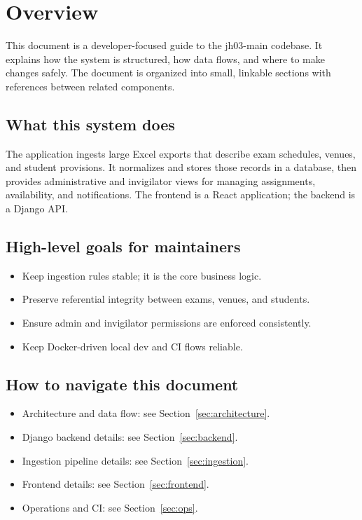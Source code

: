\section{Overview}
\label{sec:overview}

This document is a developer-focused guide to the jh03-main codebase. It explains how the system is structured, how data flows, and where to make changes safely. The document is organized into small, linkable sections with references between related components.

\subsection{What this system does}
\label{subsec:overview:problem}

The application ingests large Excel exports that describe exam schedules, venues, and student provisions. It normalizes and stores those records in a database, then provides administrative and invigilator views for managing assignments, availability, and notifications. The frontend is a React application; the backend is a Django API.

\subsection{High-level goals for maintainers}
\label{subsec:overview:maintainer_goals}

\begin{itemize}
  \item Keep ingestion rules stable; it is the core business logic.
  \item Preserve referential integrity between exams, venues, and students.
  \item Ensure admin and invigilator permissions are enforced consistently.
  \item Keep Docker-driven local dev and CI flows reliable.
\end{itemize}

\subsection{How to navigate this document}
\label{subsec:overview:navigation}

\begin{itemize}
  \item Architecture and data flow: see Section~\ref{sec:architecture}.
  \item Django backend details: see Section~\ref{sec:backend}.
  \item Ingestion pipeline details: see Section~\ref{sec:ingestion}.
  \item Frontend details: see Section~\ref{sec:frontend}.
  \item Operations and CI: see Section~\ref{sec:ops}.
\end{itemize}

